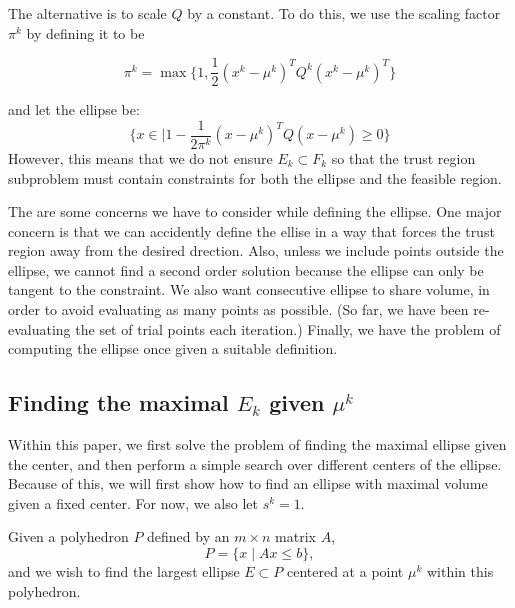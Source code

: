 \documentclass{article}
\begin{document}


The alternative is to scale $Q$ by a constant.
To do this, we use the scaling factor $\pi^k$ by defining it to be

$$\pi^k = \max \{1, \frac 1 {2} (x^{k} - \mu^{k})^T Q^k (x^{k} - \mu^{k})^T \}$$

and let the ellipse be:
$$\{x \in \mathbb | 1 - \frac 1 {2\pi^k} (x - \mu^{k})^T Q (x - \mu^{k}) \ge 0\} $$
However, this means that we do not ensure $E_k \subset F_k$ so that the trust region subproblem must contain constraints for both the ellipse and the feasible region.


The are some concerns we have to consider while defining the ellipse.
One major concern is that we can accidently define the ellise in a way that forces the trust region away from the desired drection.
Also, unless we include points outside the ellipse, we cannot find a second order solution because the ellipse can only be tangent to the constraint.
We also want consecutive ellipse to share volume, in order to avoid evaluating as many points as possible.
(So far, we have been re-evaluating the set of trial points each iteration.)
Finally, we have the problem of computing the ellipse once given a suitable definition.


\subsection{Finding the maximal $E_k$ given $\mu^k$}

Within this paper, we first solve the problem of finding the maximal ellipse given the center, and then perform a simple search over different centers of the ellipse.
Because of this, we will first show how to find an ellipse with maximal volume given a fixed center.
For now, we also let $s^k = 1$.

Given a polyhedron $P$ defined by an $m \times n$ matrix $A$,
\[
P = \{ x \; | \;  Ax \le b \},
\]
and we wish to find the largest ellipse $E \subset P$ centered at a point $\mu^{k}$ within this polyhedron.
\end{document}
